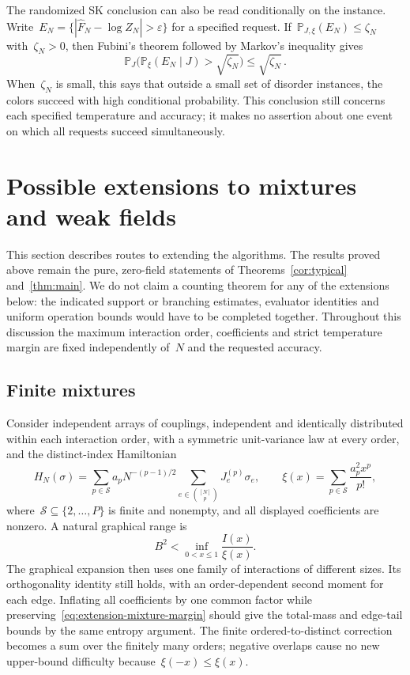 \documentclass[10pt]{article}
\theoremstyle{plain}
\theoremstyle{definition}
\theoremstyle{remark}
\begin{document}
The randomized SK conclusion can also be read conditionally on the instance. Write~$E_N=\{|\widehat F_N-\log Z_N|>\varepsilon\}$ for a specified request. If~$\mathbb P_{J,\xi}(E_N)\le\zeta_N$ with~$\zeta_N>0$, then Fubini's theorem followed by Markov's inequality gives
\begin{equation}\label{eq:conditional-success}
 \mathbb P_J\bigl(\mathbb P_\xi(E_N\mid J)>\sqrt{\zeta_N}\bigr)
 \le\sqrt{\zeta_N}\,.
\end{equation}
When~$\zeta_N$ is small, this says that outside a small set of disorder instances, the colors succeed with high conditional probability. This conclusion still concerns each specified temperature and accuracy; it makes no assertion about one event on which all requests succeed simultaneously.

\section{Possible extensions to mixtures and weak fields}\label{sec:extensions}
This section describes routes to extending the algorithms. The results proved above remain the pure, zero-field statements of Theorems~\ref{cor:typical} and~\ref{thm:main}. We do not claim a counting theorem for any of the extensions below: the indicated support or branching estimates, evaluator identities and uniform operation bounds would have to be completed together. Throughout this discussion the maximum interaction order, coefficients and strict temperature margin are fixed independently of~$N$ and the requested accuracy.

\subsection{Finite mixtures}
Consider independent arrays of couplings, independent and identically distributed within each interaction order, with a symmetric unit-variance law at every order, and the distinct-index Hamiltonian
\begin{equation}\label{eq:extension-mixture}
 H_N(\sigma)=\sum_{p\in\mathcal S}a_pN^{-(p-1)/2}
 \sum_{e\in\binom{[N]}p}J_e^{(p)}\sigma_e,
 \qquad \xi(x)=\sum_{p\in\mathcal S}\frac{a_p^2x^p}{p!},
\end{equation}
where~$\mathcal S\subseteq\{2,\ldots,P\}$ is finite and nonempty, and all displayed coefficients are nonzero. A natural graphical range is
\begin{equation}\label{eq:extension-mixture-margin}
 B^2<\inf_{0<x\le1}\frac{I(x)}{\xi(x)}.
\end{equation}
The graphical expansion then uses one family of interactions of different sizes. Its orthogonality identity still holds, with an order-dependent second moment for each edge. Inflating all coefficients by one common factor while preserving~\eqref{eq:extension-mixture-margin} should give the total-mass and edge-tail bounds by the same entropy argument. The finite ordered-to-distinct correction becomes a sum over the finitely many orders; negative overlaps cause no new upper-bound difficulty because~$\xi(-x)\le\xi(x)$.
\end{document}
